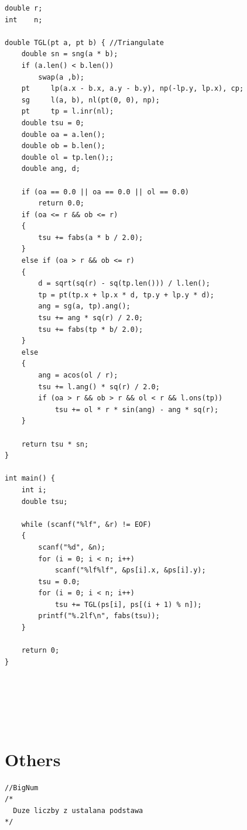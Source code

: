 \documentclass[twocolumn]{article}
\begin{document}
\begin{twocolumn}
\begin{lstlisting}[language={[ANSI]C}]
double r;
int    n;

double TGL(pt a, pt b) { //Triangulate
	double sn = sng(a * b);
	if (a.len() < b.len())
		swap(a ,b);
	pt     lp(a.x - b.x, a.y - b.y), np(-lp.y, lp.x), cp;
	sg     l(a, b), nl(pt(0, 0), np);
	pt     tp = l.inr(nl);
	double tsu = 0;
	double oa = a.len();
	double ob = b.len();
	double ol = tp.len();;
	double ang, d;

	if (oa == 0.0 || oa == 0.0 || ol == 0.0)
		return 0.0;
	if (oa <= r && ob <= r)
	{
		tsu += fabs(a * b / 2.0);
	}
	else if (oa > r && ob <= r)
	{
		d = sqrt(sq(r) - sq(tp.len())) / l.len();
		tp = pt(tp.x + lp.x * d, tp.y + lp.y * d);
		ang = sg(a, tp).ang();
		tsu += ang * sq(r) / 2.0;
		tsu += fabs(tp * b/ 2.0);
	}
	else
	{
		ang = acos(ol / r);
		tsu += l.ang() * sq(r) / 2.0;
		if (oa > r && ob > r && ol < r && l.ons(tp))
			tsu += ol * r * sin(ang) - ang * sq(r);
	}

	return tsu * sn;
}

int main() {
	int i;
	double tsu;

	while (scanf("%lf", &r) != EOF)
	{
		scanf("%d", &n);
		for (i = 0; i < n; i++)
			scanf("%lf%lf", &ps[i].x, &ps[i].y);
		tsu = 0.0;
		for (i = 0; i < n; i++)
			tsu += TGL(ps[i], ps[(i + 1) % n]);
		printf("%.2lf\n", fabs(tsu));
	}

	return 0;
}
\end{lstlisting}
\begin{lstlisting}[language={[ANSI]C}]

\end{lstlisting}
\begin{lstlisting}[language={[ANSI]C}]

\end{lstlisting}
\begin{lstlisting}[language={[ANSI]C}]

\end{lstlisting}

\begin{lstlisting}[language={[ANSI]C}]
\end{lstlisting}
\begin{lstlisting}[language={[ANSI]C}]
\end{lstlisting}
\begin{lstlisting}[language={[ANSI]C}]
\end{lstlisting}
\begin{lstlisting}[language={[ANSI]C}]
\end{lstlisting}

\newpage
\section{Others}
\begin{lstlisting}[language={[ANSI]C}]
//BigNum
/*
  Duze liczby z ustalana podstawa
*/


\end{lstlisting}
\end{twocolumn}
\end{document}
